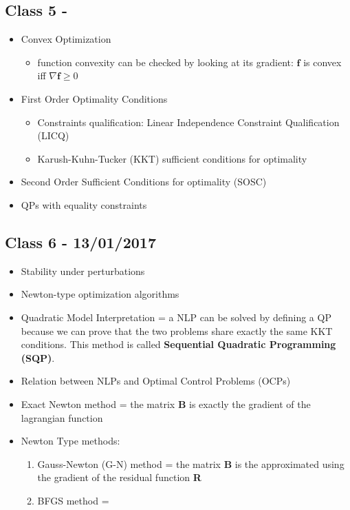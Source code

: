 \subsection*{Class 5 - }
\begin{itemize}
\item Convex Optimization
\begin{itemize}
\item function convexity can be checked by looking at its gradient: 
$\mathbf{f}$ is convex iff $\nabla \mathbf{f} \geq 0$
\end{itemize}
\item First Order Optimality Conditions
\begin{itemize}
\item Constraints qualification: Linear Independence Constraint Qualification (LICQ)
\item Karush-Kuhn-Tucker (KKT) sufficient conditions for optimality
\end{itemize}
\item Second Order Sufficient Conditions for optimality (SOSC)
\item QPs with equality constraints

\end{itemize}

\subsection*{Class 6 -  13/01/2017}
\begin{itemize}
\item Stability under perturbations
\item Newton-type optimization algorithms
\item Quadratic Model Interpretation = a NLP can be solved by defining a QP because we can prove that the two problems share exactly the same KKT conditions. This method is called \textbf{Sequential Quadratic Programming (SQP)}.
\item Relation between NLPs and Optimal Control Problems (OCPs)
\item Exact Newton method = the matrix $\mathbf{B}$ is exactly the gradient of the lagrangian function
\item Newton Type methods:
\begin{enumerate}
\item Gauss-Newton (G-N) method = the matrix \textbf{B} is the approximated using the gradient of the residual function \textbf{R}
\item BFGS method = 
\end{enumerate}
\end{itemize}
